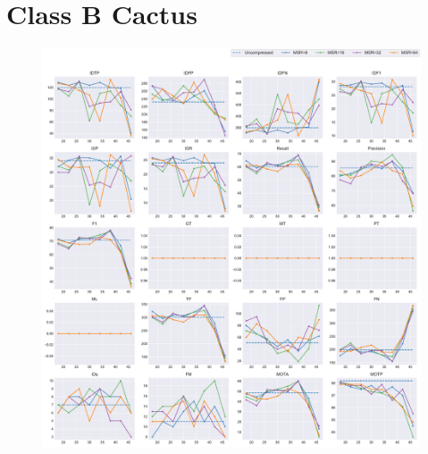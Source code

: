 
\section{Class B Cactus}
\label{sec:appendix/Cactus_all}


\begin{figure}[!htbp]
\centering
\includegraphics[width=1.0\linewidth]{img/appendix/Cactus_all_multiplots_qp.pdf}
\caption[Result of all object classes in Class B Cactus with Horizontal Axis of QP]{}
\label{fig:Cactus_all_qp}
\end{figure}

